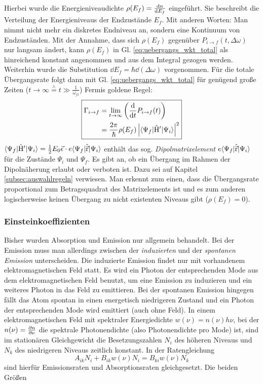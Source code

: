 Hierbei wurde die Energieniveaudichte $\rho(E_f)=\frac{\mathrm{d} n}{\mathrm{d} E_f}$ eingeführt. Sie
beschreibt die Verteilung der Energieniveaus der Endzustände $E_f$. Mit anderen
Worten: Man nimmt nicht mehr ein diskretes Endniveau an, sondern eine Kontinuum
von Endzuständen. Mit der Annahme, dass sich $\rho(E_f)$ gegenüber $P_{i\to
f}(t,\Delta\omega)$ nur langsam ändert, kann $\rho(E_f)$ in Gl. \eqref{eq:uebergangs_wkt_total} als hinreichend konstant angenommen und aus dem Integral gezogen werden. Weiterhin wurde die Substitution $\dd E_f=\hbar\dd(\Delta\omega)$ vorgenommen. Für die
totale Übergangsrate folgt dann mit Gl. \eqref{eq:uebergangs_wkt_total}
für genügend große Zeiten ($t\to\infty\stackrel{\wedge}{=}
t\gg\frac{1}{\omega_{fi}}$) Fermis
goldene Regel:
\begin{equation}\label{eq:uebergangs_rate_total}
	\boxed{
		\begin{split}
			\Gamma_{i\to f}
			&= \lim_{t\to\infty}{\left(\frac{\mathrm{d} }{\mathrm{d} t}{P_{i\to f}(t)}\right)}\\
			&= \frac{2\pi}{\hbar}\rho(E_f)\left|\langle{\Psi_f}|\hat{\mathrm{H}}'|{\Psi_i}\rangle\right|^2
		\end{split}
	}
\end{equation}
$\langle{\Psi_f}|\hat{\mathrm{H}}'|{\Psi_i}\rangle =
\frac{1}{2}E_0\vec{\epsilon}\cdot e\langle{\Psi_f}|\hat{\vec{\mathrm{r}}}|{\Psi_i}\rangle$ enthält
das sog. \textit{Dipolmatrixelement} $e\langle{\Psi_f}|\hat{\vec{\mathrm{r}}}|{\Psi_i}\rangle$ für die Zustände
$\Psi_i$ und $\Psi_f$. Es gibt an, ob ein Übergang im Rahmen der Dipolnäherung
erlaubt oder verboten ist. Dazu sei auf Kapitel \ref{subsec:auswahlregeln}
verwiesen. Man erkennt zum einen, dass die Übergangsrate proportional zum
Betragsquadrat des Matrixelements ist und es zum anderen logischerweise keinen
Übergang zu nicht existenten Niveaus gibt ($\rho(E_f)=0$). 

\subsubsection{Einsteinkoeffizienten}\label{subsubsec:einsteinkoeffizienten}
Bisher wurden Absorption und Emission nur allgemein behandelt. Bei der Emission
muss man allerdings zwischen der \textit{induzierten} und der \textit{spontanen
Emission} unterscheiden. Die induzierte Emission findet nur mit vorhandenem
elektromagnetischen Feld statt. Es wird ein Photon der entsprechenden Mode aus
dem elektromagnetischen Feld benutzt, um eine Emission zu induzieren und ein
weiteres Photon in das Feld zu emittieren. Bei der spontanen Emission hingegen
fällt das Atom spontan in einen energetisch niedrigeren Zustand und ein
Photon der entsprechenden Mode wird emittiert (auch ohne Feld). In einem
elektromagnetischen Feld mit spektraler Energiedichte $w(\nu)=n(\nu)h\nu$, bei
der $n(\nu)=\frac{\partial n}{\partial \nu}$ die spektrale Photonendichte (also Photonendichte
pro Mode) ist, sind im stationären Gleichgewicht die Besetzungszahlen $N_i$ des
höheren Niveaus und $N_k$ des niedrigeren Niveaus zeitlich konstant. In der Ratengleichung
\begin{equation}\label{eq:raten_gleichung}
	A_{ik}N_i+B_{ik}w(\nu)N_i=B_{ki}w(\nu)N_k
\end{equation}
sind hierfür Emissionsraten und Absorptionsraten gleichgesetzt.
Die beiden Größen

